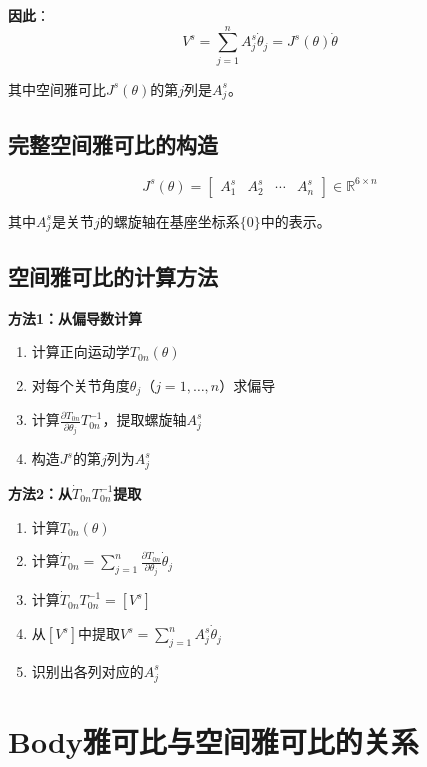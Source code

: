\documentclass[12pt,a4paper]{article}
\begin{document}
\textbf{因此}：
\begin{equation}
V^s = \sum_{j=1}^{n} A_j^s \dot{\theta}_j = J^s(\theta) \dot{\theta}
\end{equation}

其中空间雅可比$J^s(\theta)$的第$j$列是$A_j^s$。

\subsection{完整空间雅可比的构造}

\begin{equation}
J^s(\theta) = \begin{bmatrix} A_1^s & A_2^s & \cdots & A_n^s \end{bmatrix} \in \mathbb{R}^{6 \times n}
\label{eq:space_jacobian_full}
\end{equation}

其中$A_j^s$是关节$j$的螺旋轴在基座坐标系$\{0\}$中的表示。

\subsection{空间雅可比的计算方法}

\textbf{方法1：从偏导数计算}

\begin{enumerate}
\item 计算正向运动学$T_{0n}(\theta)$
\item 对每个关节角度$\theta_j$（$j = 1, \ldots, n$）求偏导
\item 计算$\frac{\partial T_{0n}}{\partial \theta_j} T_{0n}^{-1}$，提取螺旋轴$A_j^s$
\item 构造$J^s$的第$j$列为$A_j^s$
\end{enumerate}

\textbf{方法2：从$\dot{T}_{0n} T_{0n}^{-1}$提取}

\begin{enumerate}
\item 计算$T_{0n}(\theta)$
\item 计算$\dot{T}_{0n} = \sum_{j=1}^{n} \frac{\partial T_{0n}}{\partial \theta_j} \dot{\theta}_j$
\item 计算$\dot{T}_{0n} T_{0n}^{-1} = [V^s]$
\item 从$[V^s]$中提取$V^s = \sum_{j=1}^{n} A_j^s \dot{\theta}_j$
\item 识别出各列对应的$A_j^s$
\end{enumerate}

\section{Body雅可比与空间雅可比的关系}
\end{document}
